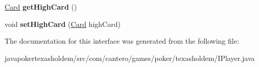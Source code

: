 \begin{DoxyCompactItemize}
\item 
\hypertarget{interfacecom_1_1cantero_1_1games_1_1poker_1_1texasholdem_1_1_i_player_acadf656d625af7b53d77b236b88474bb}{}\hyperlink{classcom_1_1cantero_1_1games_1_1poker_1_1texasholdem_1_1_card}{Card} {\bfseries get\+High\+Card} ()\label{interfacecom_1_1cantero_1_1games_1_1poker_1_1texasholdem_1_1_i_player_acadf656d625af7b53d77b236b88474bb}

\item 
\hypertarget{interfacecom_1_1cantero_1_1games_1_1poker_1_1texasholdem_1_1_i_player_a625a2de62f67418c1984b65d5e9c6a7d}{}void {\bfseries set\+High\+Card} (\hyperlink{classcom_1_1cantero_1_1games_1_1poker_1_1texasholdem_1_1_card}{Card} high\+Card)\label{interfacecom_1_1cantero_1_1games_1_1poker_1_1texasholdem_1_1_i_player_a625a2de62f67418c1984b65d5e9c6a7d}

\end{DoxyCompactItemize}


The documentation for this interface was generated from the following file\+:\begin{DoxyCompactItemize}
\item 
javapokertexasholdem/src/com/cantero/games/poker/texasholdem/I\+Player.\+java\end{DoxyCompactItemize}

